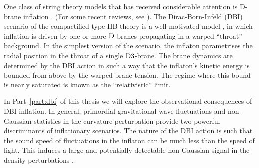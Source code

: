 One class of string theory models that has received 
considerable attention is D-brane inflation
\cite{brane1,brane2,brane3,brane4,brane5,
brane6,brane7,brane8,brane9,brane10,brane11,brane12,brane13,
brane14,brane15,brane16,brane17,Brodie:2003qv,Vikman:2006hk, 
Mukhanov:2005bu,Kallosh:2007wm,brane18,
brane19,brane20,brane21}. 
(For some recent reviews, see
\cite{tyereview,cline,McAllister:2007bg,Lorenz:2007ze,
Bean:2007eh,bean}). 
The Dirac-Born-Infeld (DBI) scenario 
of the compactified type IIB theory is a well-motivated model \cite{brane6,brane11}, 
in which inflation is driven by one or more ${\rm D}$-branes 
propagating in a warped ``throat'' background. 
% 
In the simplest version of the scenario, 
the inflaton parametrises the radial 
position in the throat of a single ${\rm D3}$-brane. 
The brane dynamics are determined by the DBI action in such a 
way that the inflaton's kinetic energy is bounded from above by the warped 
brane tension. The regime where this bound is nearly saturated is 
known as the ``relativistic'' limit.






In Part~\ref{part:dbi} of this thesis we will 
explore the observational consequences of DBI inflation. 
In general, primordial gravitational wave fluctuations
and non-Gaussian statistics in the curvature perturbation provide 
two powerful discriminants of inflationary scenarios. 
The nature of the DBI action is such that the sound 
speed of fluctuations in the inflaton can be much less than the speed of 
light. This induces a large and potentially detectable non-Gaussian 
signal in the density perturbations \cite{brane6,brane11,lidser3,chenetal}. 


